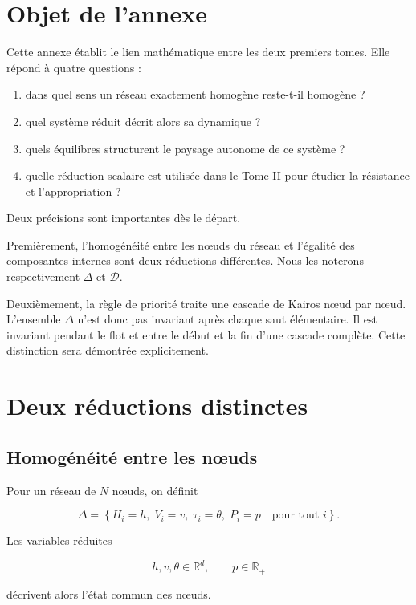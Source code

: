 \section{Objet de l'annexe}
\label{annexe-reduction-objet}

Cette annexe établit le lien mathématique entre les deux premiers
tomes. Elle répond à quatre questions :

\begin{enumerate}
\item
  dans quel sens un réseau exactement homogène reste-t-il homogène ?
\item
  quel système réduit décrit alors sa dynamique ?
\item
  quels équilibres structurent le paysage autonome de ce système ?
\item
  quelle réduction scalaire est utilisée dans le Tome II pour étudier
  la résistance et l'appropriation ?
\end{enumerate}

Deux précisions sont importantes dès le départ.

Premièrement, l'homogénéité entre les nœuds du réseau et l'égalité des
composantes internes sont deux réductions différentes. Nous les
noterons respectivement \(\Delta\) et \(\mathcal D\).

Deuxièmement, la règle de priorité traite une cascade de Kairos nœud
par nœud. L'ensemble \(\Delta\) n'est donc pas invariant après chaque
saut élémentaire. Il est invariant pendant le flot et entre le début
et la fin d'une cascade complète. Cette distinction sera démontrée
explicitement.

\section{Deux réductions distinctes}
\label{annexe-reduction-deux-reductions}

\subsection{Homogénéité entre les nœuds}

Pour un réseau de \(N\) nœuds, on définit

\[
\Delta
=
\left\{
H_i=h,\;
V_i=v,\;
\tau_i=\theta,\;
P_i=p
\quad
\text{pour tout }i
\right\}.
\]

Les variables réduites

\[
h,v,\theta\in\mathbb R^d,
\qquad
p\in\mathbb R_+
\]

décrivent alors l'état commun des nœuds.

